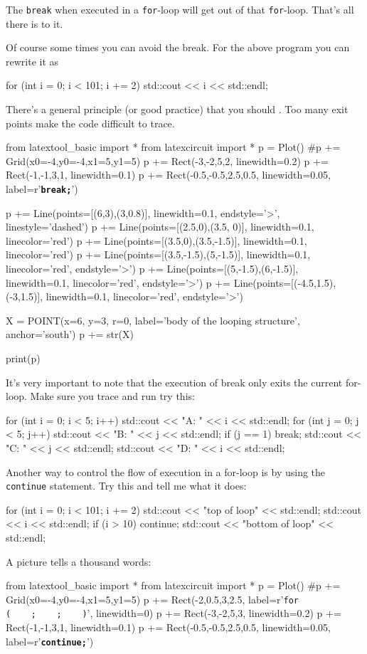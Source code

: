\begin{console}
The \texttt{break} when executed in a \texttt{for}-loop will get out of that \texttt{for}-loop. That's all there is to it.

Of course some times you can avoid the break. For the above program you
can rewrite it as
\begin{console}
for (int i = 0; i < 101; i += 2)
{   
    std::cout << i << std::endl;
}
\end{console}
There's a general principle (or good practice) that you
should . Too
many exit points make the code difficult to trace.
\begin{python}
from latextool_basic import *
from latexcircuit import *
p = Plot()
#p += Grid(x0=-4,y0=-4,x1=5,y1=5)
p += Rect(-3,-2,5,2, linewidth=0.2)
p += Rect(-1,-1,3,1, linewidth=0.1)
p += Rect(-0.5,-0.5,2.5,0.5, linewidth=0.05, label=r'\texttt{\textbf{break;}}')


p += Line(points=[(6,3),(3,0.8)], linewidth=0.1, endstyle='>', linestyle='dashed')
p += Line(points=[(2.5,0),(3.5, 0)], linewidth=0.1, linecolor='red')
p += Line(points=[(3.5,0),(3.5,-1.5)], linewidth=0.1, linecolor='red')
p += Line(points=[(3.5,-1.5),(5,-1.5)], linewidth=0.1, linecolor='red', endstyle='>')
p += Line(points=[(5,-1.5),(6,-1.5)], linewidth=0.1, linecolor='red', endstyle='>')
p += Line(points=[(-4.5,1.5),(-3,1.5)], linewidth=0.1, linecolor='red', endstyle='>')

X = POINT(x=6, y=3, r=0, label='body of the looping structure', anchor='south')
p += str(X)

print(p)
\end{python}
It's very important to note that the execution of break
only exits the current for-loop. Make sure you trace and run try this:
\begin{console}
for (int i = 0; i < 5; i++)
{   
    std::cout << "A: " << i << std::endl;
    for (int j = 0; j < 5; j++)
    {   
        std::cout << "B: " << j << std::endl;
        if (j == 1) break;
        std::cout << "C: " << j << std::endl;
    }
    std::cout << "D: " << i << std::endl;
}
\end{console}
\newpage{}

Another way to control the flow of execution in a for-loop is by using
the \texttt{continue} statement. Try this and tell me what it does:
\begin{console}
for (int i = 0; i < 101; i += 2)
{   
    std::cout << "top of loop" << std::endl;
    std::cout << i << std::endl;
    if (i > 10) continue;
    std::cout << "bottom of loop" << std::endl;
}
\end{console}
A picture tells a thousand words:
\begin{python}
from latextool_basic import *
from latexcircuit import *
p = Plot()
#p += Grid(x0=-4,y0=-4,x1=5,y1=5)
p += Rect(-2,0.5,3,2.5, label=r'\large{\texttt{for  (\ \ \ \ ;\ \ \ \ ;\ \ \ \ )}}', linewidth=0)
p += Rect(-3,-2,5,3, linewidth=0.2)
p += Rect(-1,-1,3,1, linewidth=0.1)
p += Rect(-0.5,-0.5,2.5,0.5, linewidth=0.05, label=r'\texttt{\textbf{continue;}}')



\end{python}
\end{console}
